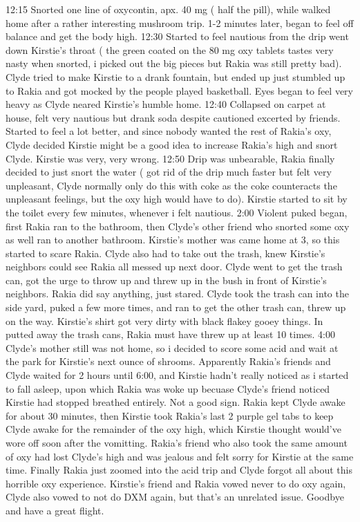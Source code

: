 \documentclass[12pt]{book}
\begin{document}
12:15 Snorted one line of oxycontin, apx. 40 mg ( half the pill), while walked home after a rather interesting mushroom trip. 1-2 minutes later, began to feel off balance and get the body high. 12:30 Started to feel nautious from the drip went down Kirstie's throat ( the green coated on the 80 mg oxy tablets tastes very nasty when snorted, i picked out the big pieces but Rakia was still pretty bad). Clyde tried to make Kirstie to a drank fountain, but ended up just stumbled up to Rakia and got mocked by the people played basketball. Eyes began to feel very heavy as Clyde neared Kirstie's humble home. 12:40 Collapsed on carpet at house, felt very nautious but drank soda despite cautioned excerted by friends. Started to feel a lot better, and since nobody wanted the rest of Rakia's oxy, Clyde decided Kirstie might be a good idea to increase Rakia's high and snort Clyde. Kirstie was very, very wrong. 12:50 Drip was unbearable, Rakia finally decided to just snort the water ( got rid of the drip much faster but felt very unpleasant, Clyde normally only do this with coke as the coke counteracts the unpleasant feelings, but the oxy high would have to do). Kirstie started to sit by the toilet every few minutes, whenever i felt nautious. 2:00 Violent puked began, first Rakia ran to the bathroom, then Clyde's other friend who snorted some oxy as well ran to another bathroom. Kirstie's mother was came home at 3, so this started to scare Rakia. Clyde also had to take out the trash, knew Kirstie's neighbors could see Rakia all messed up next door. Clyde went to get the trash can, got the urge to throw up and threw up in the bush in front of Kirstie's neighbors. Rakia did say anything, just stared. Clyde took the trash can into the side yard, puked a few more times, and ran to get the other trash can, threw up on the way. Kirstie's shirt got very dirty with black flakey gooey things. In putted away the trash cans, Rakia must have threw up at least 10 times. 4:00 Clyde's mother still was not home, so i decided to score some acid and wait at the park for Kirstie's next ounce of shrooms. Apparently Rakia's friends and Clyde waited for 2 hours until 6:00, and Kirstie hadn't really noticed as i started to fall asleep, upon which Rakia was woke up becuase Clyde's friend noticed Kirstie had stopped breathed entirely. Not a good sign. Rakia kept Clyde awake for about 30 minutes, then Kirstie took Rakia's last 2 purple gel tabs to keep Clyde awake for the remainder of the oxy high, which Kirstie thought would've wore off soon after the vomitting. Rakia's friend who also took the same amount of oxy had lost Clyde's high and was jealous and felt sorry for Kirstie at the same time. Finally Rakia just zoomed into the acid trip and Clyde forgot all about this horrible oxy experience. Kirstie's friend and Rakia vowed never to do oxy again, Clyde also vowed to not do DXM again, but that's an unrelated issue. Goodbye and have a great flight.
\end{document}
